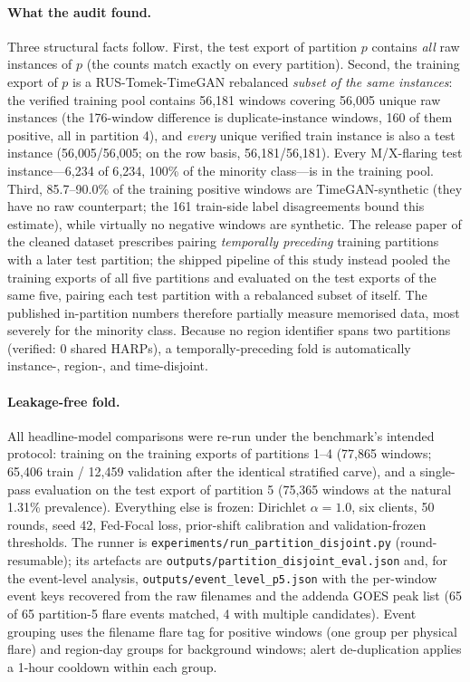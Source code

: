 \paragraph{What the audit found.}
Three structural facts follow. First, the test export of partition
$p$ contains \emph{all} raw instances of $p$ (the counts match exactly
on every partition). Second, the training export of $p$ is a
RUS-Tomek-TimeGAN rebalanced \emph{subset of the same instances}: the
verified training pool contains 56{,}181 windows covering 56{,}005
unique raw instances (the 176-window difference is
duplicate-instance windows, 160 of them positive, all in partition
4), and \emph{every} unique verified train instance is also a test
instance (56{,}005/56{,}005; on the row basis, 56{,}181/56{,}181). Every
M/X-flaring test
instance---6{,}234 of 6{,}234, 100\% of the minority class---is in the
training pool. Third, 85.7--90.0\% of the training positive windows are
TimeGAN-synthetic (they have no raw counterpart; the 161 train-side
label disagreements bound this estimate), while virtually no
negative windows are synthetic. The release paper of the cleaned
dataset prescribes pairing \emph{temporally preceding} training
partitions with a later test partition; the shipped pipeline of this
study instead pooled the training exports of all five partitions and
evaluated on the test exports of the same five, pairing each test
partition with a rebalanced subset of itself. The published
in-partition numbers therefore partially measure memorised data,
most severely for the minority class. Because no region identifier
spans two partitions (verified: 0 shared HARPs), a
temporally-preceding fold is automatically instance-, region-, and
time-disjoint.

\paragraph{Leakage-free fold.}
All headline-model comparisons were re-run under the benchmark's
intended protocol: training on the training exports of partitions 1--4
(77{,}865 windows; 65{,}406 train / 12{,}459 validation after the
identical stratified carve), and a single-pass evaluation on the test
export of partition 5 (75{,}365 windows at the natural 1.31\%
prevalence). Everything else is frozen: Dirichlet $\alpha=1.0$, six
clients, 50 rounds, seed 42, Fed-Focal loss, prior-shift calibration
and validation-frozen thresholds. The runner is
\texttt{experiments/run\_partition\_disjoint.py} (round-resumable);
its artefacts are \texttt{outputs/partition\_disjoint\_eval.json} and,
for the event-level analysis, \texttt{outputs/event\_level\_p5.json}
with the per-window event keys recovered from the raw filenames and
the addenda GOES peak list (65 of 65 partition-5 flare events matched,
4 with multiple candidates). Event grouping uses the filename flare
tag for positive windows (one group per physical flare) and
region-day groups for background windows; alert de-duplication
applies a 1-hour cooldown within each group.
